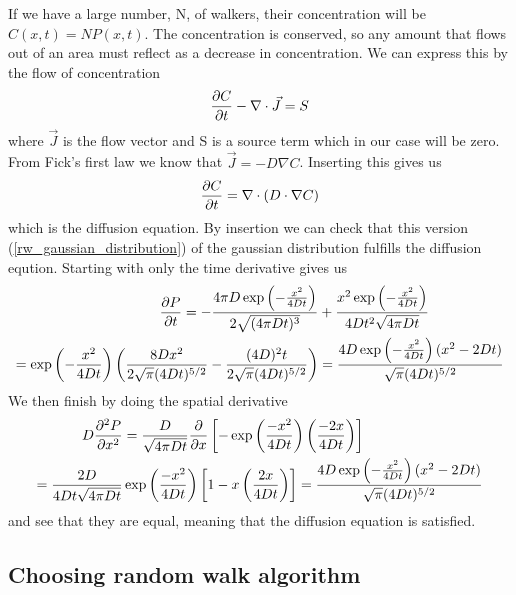 If we have a large number, N, of walkers, their concentration will be $C(x,t) = NP(x,t)$. 
The concentration is conserved, so any amount that flows out of an area must reflect as a decrease in concentration. 
We can express this by the flow of concentration
\begin{equation}
 \frac{\partial C}{\partial t} -\nabla\cdot\vec{J} = S
\end{equation}
where $\vec{J}$ is the flow vector and S is a source term which in our case will be zero.
From Fick's first law we know that $\vec{J} = -D\nabla C$. Inserting this gives us
\begin{equation}\label{simple_diffusion_equation}
 \frac{\partial C}{\partial t} = \nabla\cdot \left(D\cdot\nabla C\right)
\end{equation}
which is the diffusion equation.
By insertion we can check that this version (\ref{rw_gaussian_distribution}) of the gaussian distribution fulfills the diffusion eqution. 
Starting with only the time derivative gives us
\begin{align*}
 \frac{\partial P}{\partial t} = -\frac{4\pi D\exp\left(-\frac{x^2}{4Dt}\right)}{2\sqrt{(4\pi Dt)^3}}&+\frac{x^2\exp\left(-\frac{x^2}{4Dt}\right)}{4Dt^2\sqrt{4\pi Dt}} \\
 = \exp\left(-\frac{x^2}{4Dt}\right)\left(\frac{8Dx^2}{2\sqrt{\pi}(4Dt)^{5/2}} -\frac{(4D)^2t}{2\sqrt{\pi}(4Dt)^{5/2}}\right)&= \frac{4D\exp\left(-\frac{x^2}{4Dt}\right)(x^2-2Dt)}{\sqrt{\pi}(4Dt)^{5/2}}
\end{align*}
 We then finish by doing the spatial derivative
\begin{align*}
 D\frac{\partial^2 P}{\partial x^2} &= \frac{D}{\sqrt{4\pi Dt}}\frac{\partial}{\partial x}\left[-\exp\left(\frac{-x^2}{4Dt}\right)\left(\frac{-2x}{4Dt}\right)\right]\\
 = \frac{2D}{4Dt\sqrt{4\pi Dt}}&\exp\left(\frac{-x^2}{4Dt}\right)\left[1-x\left(\frac{2x}{4Dt}\right)\right] = \frac{4D\exp\left(-\frac{x^2}{4Dt}\right)(x^2-2Dt)}{\sqrt{\pi}(4Dt)^{5/2}}
\end{align*}
and see that they are equal, meaning that the diffusion equation is satisfied.

\subsection{Choosing random walk algorithm}\label{choosing_random_walk_algorithm}

